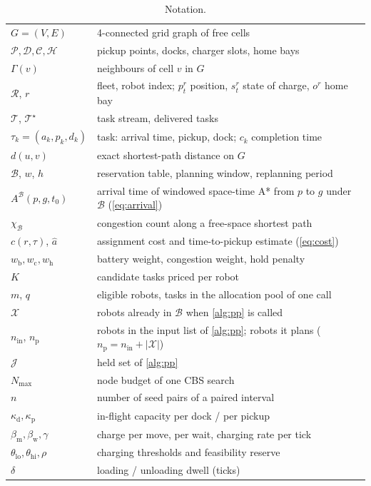 \begin{table}[h]
\centering
\caption{Notation.}
\label{tab:notation}
\small
\begin{tabular}{ll}
\toprule
$G=(V,E)$ & 4-connected grid graph of free cells\\
$\mathcal{P},\mathcal{D},\mathcal{C},\mathcal{H}$ & pickup points, docks, charger slots, home bays\\
$\Gamma(v)$ & neighbours of cell $v$ in $G$\\
$\mathcal{R}$, $r$ & fleet, robot index; $p^r_t$ position, $s^r_t$ state of charge, $o^r$ home bay\\
$\mathcal{T}$, $\mathcal{T}^{\star}$ & task stream, delivered tasks\\
$\tau_k=(a_k,p_k,d_k)$ & task: arrival time, pickup, dock; $c_k$ completion time\\
$d(u,v)$ & exact shortest-path distance on $G$\\
$\mathcal{B}$, $w$, $h$ & reservation table, planning window, replanning period\\
$A^{\mathcal{B}}(p,g,t_0)$ & arrival time of windowed space-time A* from $p$ to $g$ under $\mathcal{B}$ (\cref{eq:arrival})\\
$\chi_{\mathcal{B}}$ & congestion count along a free-space shortest path\\
$c(r,\tau)$, $\hat a$ & assignment cost and time-to-pickup estimate (\cref{eq:cost})\\
$w_{\mathrm{b}},w_{\mathrm{c}},w_{\mathrm{h}}$ & battery weight, congestion weight, hold penalty\\
$K$ & candidate tasks priced per robot\\
$m$, $q$ & eligible robots, tasks in the allocation pool of one call\\
$\mathcal{X}$ & robots already in $\mathcal{B}$ when \cref{alg:pp} is called\\
$n_{\mathrm{in}}$, $n_{\mathrm{p}}$ & robots in the input list of \cref{alg:pp}; robots it plans ($n_{\mathrm{p}}=n_{\mathrm{in}}+|\mathcal{X}|$)\\
$\mathcal{J}$ & held set of \cref{alg:pp}\\
$N_{\max}$ & node budget of one CBS search\\
$n$ & number of seed pairs of a paired interval\\
$\kappa_{\mathrm{d}},\kappa_{\mathrm{p}}$ & in-flight capacity per dock / per pickup\\
$\beta_{\mathrm{m}},\beta_{\mathrm{w}},\gamma$ & charge per move, per wait, charging rate per tick\\
$\theta_{\mathrm{lo}},\theta_{\mathrm{hi}},\rho$ & charging thresholds and feasibility reserve\\
$\delta$ & loading / unloading dwell (ticks)\\
\bottomrule
\end{tabular}
\end{table}

